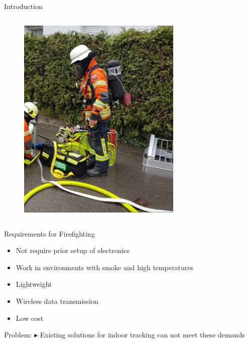 \documentclass[aspectratio=169,handout]{beamer}
\begin{document}
{\begin{frame}{Introduction}
\begin{columns}
				\begin{figure}
					\centering
					\includegraphics[width=0.7\textwidth]{firefighter.png}
				\end{figure}
	
		\end{columns}
		
		
	\end{frame}
	
	\begin{frame}{Requirements for Firefighting}
		\begin{itemize}
			\item<2-> Not require prior setup of electronics
			\item<3-> Work in environments with smoke and high temperatures
			\item<4-> Lightweight %
			\item<5-> Wireless data transmission %
			\item<6-> Low cost %
		\end{itemize}
		\pause
		\pause
		\pause
		\pause
		\pause
		\pause
		\begin{block}{Problem:}
			$\blacktriangleright$ Existing solutions for indoor tracking can not meet these demands
		\end{block}
		
	\end{frame}
	
}
\end{document}
